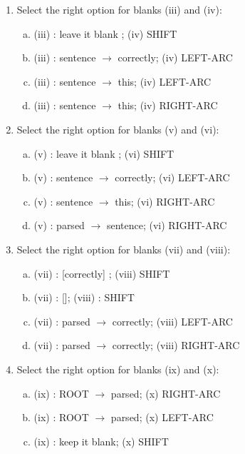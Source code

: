 \begin{enumerate}[1.]
\begin{enumerate}[4a.]

\item {} Select the right option for blanks (iii) and (iv):

\begin{enumerate}[(a)]
\item (iii) : leave it blank ; (iv) SHIFT
\item (iii) : sentence $\rightarrow$ correctly; (iv) LEFT-ARC
\item (iii) : sentence $\rightarrow$ this; (iv) LEFT-ARC
\item (iii) : sentence $\rightarrow$ this; (iv) RIGHT-ARC
\end{enumerate}


\item {} Select the right option for blanks (v) and (vi):

\begin{enumerate}[(a)]
\item (v) : leave it blank ; (vi) SHIFT
\item (v) : sentence $\rightarrow$ correctly; (vi) LEFT-ARC
\item (v) : sentence $\rightarrow$ this; (vi) RIGHT-ARC
\item (v) : parsed $\rightarrow$ sentence; (vi) RIGHT-ARC
\end{enumerate}


\item {} Select the right option for blanks (vii) and (viii):

\begin{enumerate}[(a)]
\item (vii) : [correctly] ; (viii) SHIFT
\item (vii) : []; (viii) : SHIFT
\item (vii) : parsed $\rightarrow$ correctly; (viii) LEFT-ARC
\item (vii) : parsed $\rightarrow$ correctly; (viii) RIGHT-ARC
\end{enumerate}


\item {} Select the right option for blanks (ix) and (x):

\begin{enumerate}[(a)]
\item (ix) : ROOT $\rightarrow$ parsed; (x) RIGHT-ARC
\item (ix) : ROOT $\rightarrow$ parsed; (x) LEFT-ARC
\item (ix) : keep it blank; (x) SHIFT
\end{enumerate}


\end{enumerate}
\end{enumerate}
